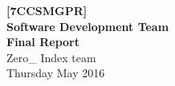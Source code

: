 \begin{titlepage}
    \begin{center}
        \vspace*{6cm}
        \noindent\makebox[\linewidth]{\rule{\paperwidth}{0.4pt}}
        \Huge
        \textbf{[7CCSMGPR]\\Software Development Team\\}
        \vspace{0.5cm}
        \Large
        \textbf{Final Report\\}
        \vspace{1.5cm}
        \large
        \textsf{Zero\_ Index team\\}
        \vspace{1cm}
        \textsf{Thursday  May 2016}
        \noindent\makebox[\linewidth]{\rule{\paperwidth}{0.4pt}}
        \vfill
	\end{center}
	\vspace{1cm}
\end{titlepage}
